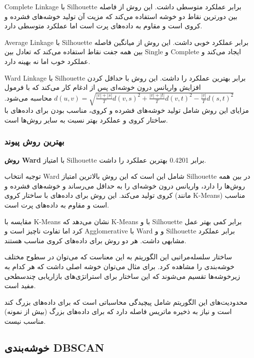 \documentclass{article}
\begin{document}
Complete Linkage با Silhouette برابر  عملکرد متوسطی داشت. این روش از فاصله بین دورترین نقاط دو خوشه استفاده می‌کند که مزیت آن تولید خوشه‌های فشرده و کروی است و مقاوم به داده‌های پرت است اما عملکرد متوسطی دارد.

Average Linkage با Silhouette برابر  عملکرد خوبی داشت. این روش از میانگین فاصله بین همه جفت نقاط استفاده می‌کند که تعادل بین Single و Complete ایجاد می‌کند و عملکرد خوب اما نه بهینه دارد.

Ward Linkage با Silhouette برابر  بهترین عملکرد را داشت. این روش با حداقل کردن افزایش واریانس درون خوشه‌ای پس از ادغام کار می‌کند که با فرمول $d(u,v) = \sqrt{\frac{|v|+|s|}{T}d(v,s)^2 + \frac{|v|+|t|}{T}d(v,t)^2 - \frac{|v|}{T}d(s,t)^2}$ محاسبه می‌شود. مزایای این روش شامل تولید خوشه‌های فشرده و کروی، مناسب بودن برای داده‌های با ساختار کروی و عملکرد بهتر نسبت به سایر روش‌ها است.

\subsubsection{بهترین روش پیوند}

\textbf{روش Ward} با امتیاز Silhouette برابر 0.4201 بهترین عملکرد را داشت.

توجیه انتخاب Ward شامل این است که این روش بالاترین امتیاز Silhouette در بین همه روش‌ها را دارد، واریانس درون خوشه‌ای را به حداقل می‌رساند و خوشه‌های فشرده و کروی تولید می‌کند. این روش برای داده‌های با ساختار کروی (مانند K-Means) مناسب است و مقاوم به داده‌های پرت است.

مقایسه با K-Means نشان می‌دهد که K-Means با  و Silhouette برابر  کمی بهتر عمل کرد اما تفاوت ناچیز است و Agglomerative با Ward و  و Silhouette برابر  عملکرد مشابهی داشت. هر دو روش برای داده‌های کروی مناسب هستند.

ساختار سلسله‌مراتبی این الگوریتم به این معناست که می‌توان در سطوح مختلف خوشه‌بندی را مشاهده کرد. برای مثال می‌توان  خوشه اصلی داشت که هر کدام به زیرخوشه‌ها تقسیم می‌شوند که این ساختار برای استراتژی‌های بازاریابی چندسطحی مفید است.

محدودیت‌های این الگوریتم شامل پیچیدگی محاسباتی  است که برای داده‌های بزرگ کند است و نیاز به ذخیره ماتریس فاصله دارد که برای داده‌های بزرگ (بیش از  نمونه) مناسب نیست.

\subsection{خوشه‌بندی DBSCAN}
\end{document}
